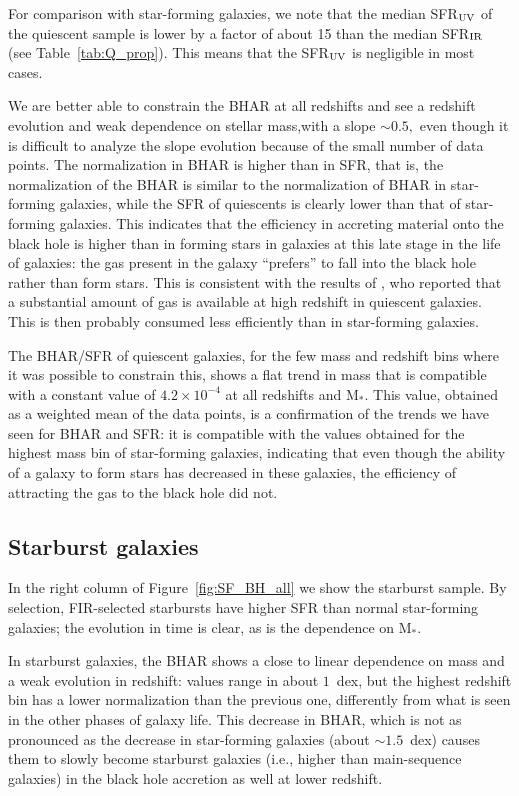  For comparison with star-forming galaxies, we note that the median SFR$_{\rm UV}$ of the quiescent sample is lower by a factor of about 15 than the median SFR$_{\rm IR}$ $ \text{}$ (see Table~\ref{tab:Q_prop}). This means that the SFR$_{\rm UV}$ is negligible in most cases.

We are better able to constrain the BHAR at all redshifts and see a redshift evolution and weak dependence on stellar mass,with a slope $\sim0.5,$ even though it is difficult to analyze the slope evolution because of the small number of data points.
The normalization in BHAR is higher than in SFR, that is, the normalization of the BHAR is similar to the normalization of BHAR in star-forming galaxies, while the SFR of quiescents is clearly lower than that of star-forming galaxies. This indicates that the efficiency in accreting material onto the black hole is higher than in forming stars in galaxies at this late stage in the life of galaxies: the gas present in the galaxy ``prefers'' to fall into the black hole rather than form stars. This is consistent with the results of \citet{2018NatAs...2..239G}, who reported that a substantial amount of gas is available at high redshift in quiescent galaxies. This is then probably consumed less efficiently than in star-forming galaxies.
    
    The BHAR/SFR of quiescent galaxies, for the few mass and redshift bins where it was possible to constrain this, shows a flat trend in mass that is compatible with a constant value of $4.2\times10^{-4}$ at all redshifts and M$_*$. This value, obtained as a weighted mean of the data points, is a confirmation of the trends we have seen for BHAR and SFR: it is compatible with the values obtained for the highest mass bin of star-forming galaxies, 
    indicating that even though the ability of a galaxy to form stars has decreased in these galaxies, the efficiency of attracting the gas to the black hole did not.


\subsection{Starburst galaxies}
In the right column of Figure~\ref{fig:SF_BH_all} we show the starburst sample. By selection, FIR-selected starbursts have higher SFR than normal star-forming galaxies; the evolution in time is clear, as is the dependence on M$_*$.  

In starburst galaxies, the BHAR shows a close to linear dependence on mass and a weak evolution in redshift: values range in about $\text{}1$~dex, but the highest redshift bin has a lower normalization than the previous one, differently from what is seen in the other phases of galaxy life. 
This decrease in BHAR, which is not as pronounced as the decrease in star-forming galaxies (about $\sim1.5$~dex) causes them to slowly become starburst galaxies (i.e., higher than main-sequence galaxies) in the black hole accretion as well at lower redshift. 
    
